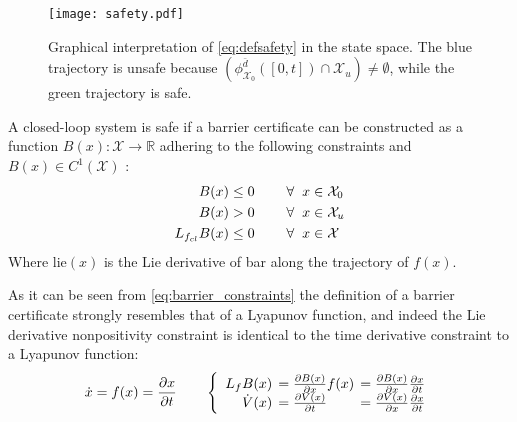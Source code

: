 \begin{figure}[H]
	\center
	\texttt{[image: safety.pdf]}	
	\caption{Graphical interpretation of \autoref{eq:defsafety} in the state space. The blue trajectory is unsafe because $\left( \phi_{\mathcal{X}_0}^{\bar{d}}([0,t]) \cap \mathcal{X}_u \right) \neq \emptyset$, while the green trajectory is safe.}
	\label{fig:defsafety}
\end{figure}
\label{def_safety}

\begin{exa}	
A closed-loop system is safe if a barrier certificate can be constructed as a function $B(x):\mathcal{X} \rightarrow \mathbb{R}$ adhering to the following constraints and $B(x) \in C^1(\mathcal{X})$ \citep{bib:org_control}:
\begin{subequations}\label{eq:barrier_constraints}
\begin{flalign}
B(x) &\leq 0 \hspace{0.8cm}  \forall \hspace{2mm} x \in \mathcal{X}_0  \label{cer1}\\
B(x) &> 0  \hspace{0.8cm}  \forall \hspace{2mm} x \in \mathcal{X}_u \label{cer2} \\
L_{f_{cl}}B(x) &\leq 0 \hspace{0.8cm}  \forall \hspace{2mm} x \in \mathcal{X} \label{cer3}
\end{flalign}
\end{subequations}
Where \gls{lie}$(x)$ is the Lie derivative of \gls{bar} along the trajectory of $f(x)$. 
\end{exa}
As it can be seen from \autoref{eq:barrier_constraints} the definition of a barrier certificate strongly resembles that of a Lyapunov function, and indeed the Lie derivative nonpositivity constraint is identical to the time derivative constraint to a Lyapunov function:
\begin{equation}
\dot{x}  = f(x) = \frac{\partial x}{\partial t} \qquad
\left\{ \begin{array}{r l l}
L_fB(x) \hspace*{-2mm}&= \tfrac{\partial B(x)}{\partial x} f(x) \hspace*{-2mm}&= \tfrac{\partial B(x)}{\partial x} \frac{\partial x}{\partial t}\\
\dot{V}(x) \hspace*{-2mm}&= \tfrac{\partial V(x)}{\partial t} \hspace*{-2mm}&= \tfrac{\partial V(x)}{\partial x}\tfrac{\partial x}{\partial t}
\end{array} \right. \label{eq:dBdt_dVdt}
\end{equation}

